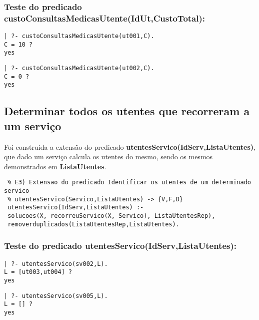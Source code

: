 \documentclass[
  oneside,
  10pt, a4paper,
  footinclude=true,
  headinclude=true,
  cleardoublepage=empty
]{scrbook}
\begin{document}
\subsubsection{Teste do predicado \textbf{custoConsultasMedicasUtente(IdUt,CustoTotal)}:}

\begin{lstlisting}
| ?- custoConsultasMedicasUtente(ut001,C).
C = 10 ? 
yes
\end{lstlisting}

\begin{lstlisting}
| ?- custoConsultasMedicasUtente(ut002,C).
C = 0 ? 
yes
\end{lstlisting}















\subsection{Determinar todos os utentes que recorreram a um serviço}

Foi construída a extensão do predicado \textbf{utentesServico(IdServ,ListaUtentes)}, que dado um serviço calcula os utentes do mesmo, sendo os mesmos demonstrados em \textbf{ListaUtentes}.\par 
\begin{lstlisting}
 % E3) Extensao do predicado Identificar os utentes de um determinado servico
 % utentesServico(Servico,ListaUtentes) -> {V,F,D}
 utentesServico(IdServ,ListaUtentes) :-
 solucoes(X, recorreuServico(X, Servico), ListaUtentesRep),
 removerduplicados(ListaUtentesRep,ListaUtentes).
\end{lstlisting}



\subsubsection{Teste do predicado \textbf{utentesServico(IdServ,ListaUtentes)}:}

\begin{lstlisting}
| ?- utentesServico(sv002,L).
L = [ut003,ut004] ? 
yes
\end{lstlisting}

\begin{lstlisting}
| ?- utentesServico(sv005,L).
L = [] ? 
yes
\end{lstlisting}
\end{document}
